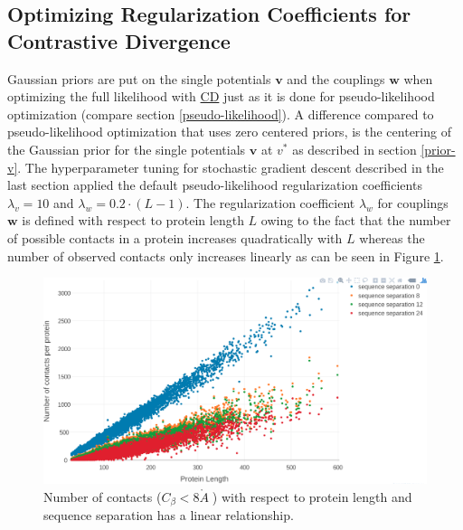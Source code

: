 \documentclass[12pt,a4paper,twoside]{book}
\newcommand{\Cb}{C_\beta}
\newcommand{\eq}{\!=\!}
\renewcommand{\v}{\mathbf{v}}
\newcommand{\w}{\mathbf{w}}
\newcommand{\angstrom}{\mathring{A} \;}
\theoremstyle{definition}
\theoremstyle{definition}
\theoremstyle{remark}
\begin{document}
\subsection{Optimizing Regularization Coefficients for Contrastive
Divergence}\label{optimizing-regularization-coefficients-for-contrastive-divergence}

Gaussian priors are put on the single potentials \(\v\) and the
couplings \(\w\) when optimizing the full likelihood with
\protect\hyperlink{abbrev}{CD} just as it is done for pseudo-likelihood
optimization (compare section \ref{pseudo-likelihood}). A difference
compared to pseudo-likelihood optimization that uses zero centered
priors, is the centering of the Gaussian prior for the single potentials
\(\v\) at \(v^*\) as described in section \ref{prior-v}. The
hyperparameter tuning for stochastic gradient descent described in the
last section applied the default pseudo-likelihood regularization
coefficients \(\lambda_v \eq 10\) and \(\lambda_w \eq 0.2\cdot(L-1)\).
The regularization coefficient \(\lambda_w\) for couplings \(\w\) is
defined with respect to protein length \(L\) owing to the fact that the
number of possible contacts in a protein increases quadratically with
\(L\) whereas the number of observed contacts only increases linearly as
can be seen in Figure \ref{fig:number-contacts-against-L}.





\begin{figure}

{\centering \includegraphics[width=0.9\linewidth]{img/full_likelihood/no_contacts_vs_protein_length_thr8} 

}

\caption{Number of contacts
(\(\Cb < 8 \angstrom\)) with respect to protein length and sequence
separation has a linear relationship.}\label{fig:number-contacts-against-L}
\end{figure}
\end{document}
